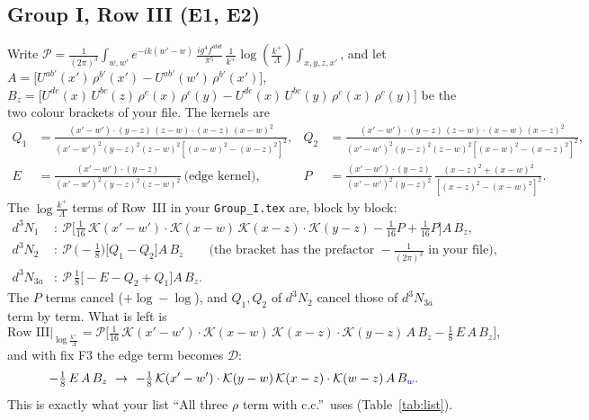\documentclass[10pt]{article}
\numberwithin{equation}{section}
\newcommand{\new}[1]{{\color{blue}#1}}
\newcommand{\LK}{\log{\left(\frac{k^{+}}{\Lambda}\right)}}
\newcommand{\AX}{\Big[U^{ab'}(x')\,\rho^{b'}(x')-U^{ab'}(w')\,\rho^{b'}(x')\Big]}
\newcommand{\BZ}[1]{\Big[U^{de}(x)\,U^{bc}(#1)\,\rho^{e}(x)\,\rho^{c}(y)-U^{de}(x)\,U^{bc}(y)\,\rho^{e}(x)\,\rho^{c}(y)\Big]}
\begin{document}
\subsection{Group I, Row III (E1, E2)}
Write $\mathcal P=\frac{1}{(2\pi)^3}\int_{w,w'}e^{-ik(w'-w)}\,\frac{ig^4f^{abd}}{\pi^5}\,\frac{1}{k^+}\LK\int_{x,y,z,x'}$, and let $A=\AX$, $B_z=\BZ{z}$ be the two colour brackets of your file. The kernels are
\begin{align*}
Q_1&=\frac{(x'-w')\cdot(y-z)\,(z-w)\cdot(x-z)\,(x-w)^{2}}{(x'-w')^{2}(y-z)^{2}(z-w)^{2}\left[(x-w)^{2}-(x-z)^{2}\right]^{2}},&
Q_2&=\frac{(x'-w')\cdot(y-z)\,(z-w)\cdot(x-w)\,(x-z)^{2}}{(x'-w')^{2}(y-z)^{2}(z-w)^{2}\left[(x-w)^{2}-(x-z)^{2}\right]^{2}},\\
E&=\frac{(x'-w')\cdot(y-z)}{(x'-w')^{2}(y-z)^{2}(z-w)^{2}}\ \text{(edge kernel)},&
P&=\frac{(x'-w')\cdot(y-z)}{(x'-w')^{2}(y-z)^{2}}\,\frac{(x-z)^{2}+(x-w)^{2}}{\left[(x-z)^{2}-(x-w)^{2}\right]^{2}}.
\end{align*}
The $\log\frac{k^+}{\Lambda}$ terms of Row~III in your \texttt{Group\_I.tex} are, block by block:
\begin{align}
d^3N_1&:\ \mathcal P\Big[\tfrac{1}{16}\,\mathcal K(x'-w')\cdot\mathcal K(x-w)\,\mathcal K(x-z)\cdot\mathcal K(y-z)-\tfrac1{16}P+\tfrac1{16}P\Big]A\,B_z,\\
d^3N_2&:\ \mathcal P\,\Big(-\tfrac18\Big)\big[Q_1-Q_2\big]A\,B_z\qquad\text{(the bracket has the prefactor }-\tfrac{1}{(2\pi)^3}\text{ in your file)},\\
d^3N_{3a}&:\ \mathcal P\,\tfrac18\big[-E-Q_2+Q_1\big]A\,B_z.
\end{align}
The $P$ terms cancel ($+\log-\log$), and $Q_1,Q_2$ of $d^3N_2$ cancel those of $d^3N_{3a}$ term by term. What is left is
\begin{equation}
\text{Row III}\big|_{\log\frac{k^+}{\Lambda}}=\mathcal P\Big[\tfrac{1}{16}\,\mathcal K(x'-w')\cdot\mathcal K(x-w)\,\mathcal K(x-z)\cdot\mathcal K(y-z)\,A\,B_z-\tfrac18\,E\,A\,B_z\Big],
\end{equation}
and with fix F3 the edge term becomes $\mathcal D$:
\begin{equation}
-\tfrac18\,E\,A\,B_z\ \to\ -\tfrac18\,\mathcal K(x'-w')\cdot\mathcal K(y-w)\,\mathcal K(x-z)\cdot\mathcal K(w-z)\,A\,B_{\new{w}}.
\end{equation}
This is exactly what your list ``All three $\rho$ term with c.c.''\ uses (Table~\ref{tab:list}).
\end{document}
